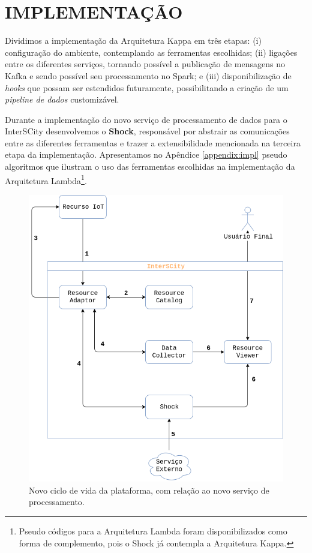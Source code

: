 \section{IMPLEMENTAÇÃO}

Dividimos a implementação da Arquitetura Kappa em três etapas:
(i) configuração do ambiente, contemplando as ferramentas escolhidas;
(ii) ligações entre os diferentes serviços, tornando possível a publicação de
    mensagens no Kafka e sendo possível seu processamento no Spark; e
(iii) disponibilização de \textit{hooks} que possam ser estendidos futuramente,
    possibilitando a criação de um \textit{pipeline de dados} customizável.

Durante a implementação do novo serviço de processamento de dados para o
InterSCity desenvolvemos o \textbf{Shock}, responsável por abstrair as
comunicações entre as diferentes
ferramentas e trazer a extensibilidade mencionada na terceira etapa da
implementação. Apresentamos no Apêndice \ref{appendix:impl}
pseudo algoritmos que ilustram o uso das ferramentas escolhidas na
implementação da Arquitetura Lambda\footnote{
Pseudo códigos para a Arquitetura Lambda foram disponibilizados como forma
de complemento, pois o Shock já contempla a Arquitetura Kappa.
}.

\begin{figure}
  \centering
    \includegraphics[scale=0.45]{figuras/shock_usage.png}
    \caption{Novo ciclo de vida da plataforma, com relação ao novo serviço de processamento.}
  \label{fig:shock_usage}
\end{figure}

